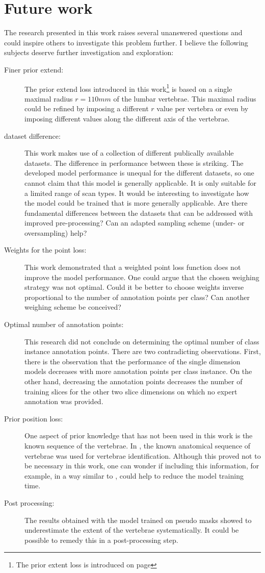 \chapter{Future work}\thispagestyle{empty}
The research presented in this work raises several unanswered questions and could inspire others to investigate this problem further.
I believe the following subjects deserve further investigation and exploration:
\begin{description}
    \item[Finer prior extend:] The prior extend loss introduced in this work\footnote{The prior extent loss is introduced on page \pageref{fig:prior_extent}} is based on a single maximal radius $r=110mm$ 
    of the lumbar vertebrae. This maximal radius could be refined by imposing a different $r$ value per vertebra or even by imposing different values along the different axis of the vertebrae.
    \item[dataset difference:] This work makes use of a collection of different publically available datasets. The difference in performance between these is striking.
    The developed model performance is unequal for the different datasets, so one cannot claim that this model is generally applicable. It is only suitable for a limited range of scan types.
    It would be interesting to investigate how the model could be trained that is more generally applicable. Are there fundamental differences between the datasets that can be addressed with improved pre-processing?
    Can an adapted sampling scheme (under- or oversampling) help? 
    \item[Weights for the point loss:] This work demonstrated that a weighted point loss function does not improve the model performance. One could argue that the chosen weighing strategy was not optimal.
    Could it be better to choose weights inverse proportional to the number of annotation points per class? Can another weighing scheme be conceived? 
    \item[Optimal number of annotation points:] This research did not conclude on determining the optimal number of class instance annotation points. There are two contradicting observations.
    First, there is the observation that the performance of the single dimension models decreases with more annotation points per class instance. 
    On the other hand, decreasing the annotation points decreases the number of training slices for the other two slice dimensions on which no expert annotation was provided.
    \item[Prior position loss:] One aspect of prior knowledge that has not been used in this work is the known sequence of the vertebrae. In \cite{Lessmann2018}, 
    the known anatomical sequence of vertebrae was used for vertebrae identification.
    Although this proved not to be necessary in this work, one can wonder if including this information, for example, in a way similar to \cite{Lessmann2018}, could help to reduce the model training time.
    \item[Post processing:] The results obtained with the model trained on pseudo masks showed to underestimate the extent of the vertebrae systematically.
    It could be possible to remedy this in a post-processing step. 
\end{description}